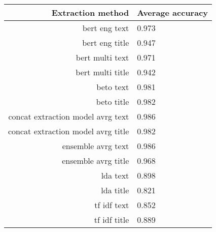 \begin{tabular}{|r|l|}
  \hline
  Extraction method & Average accuracy \\ 
  \hline
  bert eng text & 0.973 \\ 
  \hline
  bert eng title & 0.947 \\ 
  \hline
  bert multi text & 0.971 \\ 
  \hline
  bert multi title & 0.942 \\ 
  \hline
  beto text & 0.981 \\ 
  \hline
  beto title & 0.982 \\ 
  \hline
  concat extraction model avrg text & 0.986 \\ 
  \hline
  concat extraction model avrg title & 0.982 \\ 
  \hline
  ensemble avrg text & 0.986 \\ 
  \hline
  ensemble avrg title & 0.968 \\ 
  \hline
  lda text & 0.898 \\ 
  \hline
  lda title & 0.821 \\ 
  \hline
  tf idf text & 0.852 \\ 
  \hline
  tf idf title & 0.889 \\ 
  \hline
\end{tabular}
